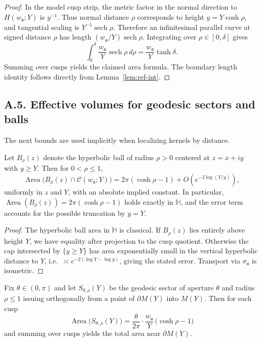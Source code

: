 \begin{proof}
In the model cusp strip, the metric factor in the normal direction to
$H(w_{\mathfrak a};Y)$ is $y^{-1}$. Thus normal distance $\rho$ corresponds to
height $y=Y\cosh\rho$, and tangential scaling is
$Y^{-1}\operatorname{sech}\rho$. Therefore an infinitesimal parallel curve at
signed distance $\rho$ has length $(w_{\mathfrak a}/Y)\operatorname{sech}\rho$.
Integrating over $\rho\in[0,\delta]$ gives
\[
\int_0^\delta \frac{w_{\mathfrak a}}{Y}\operatorname{sech}\rho\,d\rho
=\frac{w_{\mathfrak a}}{Y}\tanh\delta.
\]
Summing over cusps yields the claimed area formula. The boundary length identity
follows directly from Lemma~\ref{lem:ref-int}.
\end{proof}


\subsection*{A.5. Effective volumes for geodesic sectors and balls}

\noindent
The next bounds are used implicitly when localizing kernels by distance.

\begin{lemma}\label{lem:balls}
Let $B_\rho(z)$ denote the hyperbolic ball of radius $\rho>0$ centered at
$z=x+iy$ with $y\ge Y$. Then for $0<\rho\le 1$,
\[
\operatorname{Area}\big(B_\rho(z)\cap \mathcal C(w_{\mathfrak a};Y)\big)
= 2\pi(\cosh\rho-1)+ O\!\left(e^{-2\log(Y/y)}\right),
\]
uniformly in $z$ and $Y$, with an absolute implied constant. In particular,
$\operatorname{Area}(B_\rho(z))=2\pi(\cosh\rho-1)$ holds exactly in $\mathbb H$,
and the error term accounts for the possible truncation by $y=Y$.
\end{lemma}

\begin{proof}
The hyperbolic ball area in $\mathbb H$ is classical. If $B_\rho(z)$ lies
entirely above height $Y$, we have equality after projection to the cusp quotient.
Otherwise the cap intersected by $\{y\ge Y\}$ has area exponentially small in
the vertical hyperbolic distance to $Y$, i.e.\ $\asymp e^{-2(\log Y-\log y)}$,
giving the stated error. Transport via $\sigma_{\mathfrak a}$ is isometric.
\end{proof}

\begin{proposition}\label{prop:sectors}
Fix $\theta\in(0,\pi)$ and let $S_{\theta,\rho}(Y)$ be the geodesic sector of
aperture $\theta$ and radius $\rho\le 1$ issuing orthogonally from a point of
$\partial M(Y)$ into $M(Y)$. Then for each cusp
\[
\operatorname{Area}\big(S_{\theta,\rho}(Y)\big)
= \frac{\theta}{2\pi}\cdot \frac{w_{\mathfrak a}}{Y}\,\big(\cosh\rho-1\big)
\]
and summing over cusps yields the total area near $\partial M(Y)$.
\end{proposition}

